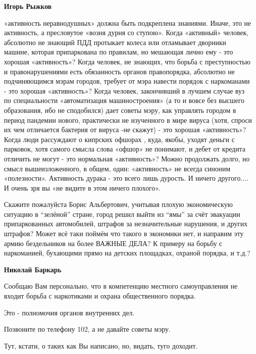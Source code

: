 \begin{itemize}
\begin{itemize}
\textbf{Игорь Рыжков} 

«активность неравнодушных» должна быть подкреплена знаниями. Иначе, это не
активность, а пресловутое «возня дурня со ступою». Когда «активный» человек,
абсолютно не знающий ПДД протыкает колеса или отламывает дворники машине,
которая припаркована по правилам, но мешающая лично ему - это хорошая
«активность»? Когда человек, не знающих, что борьба с преступностью и
правонарушениями есть обязанность органов правопорядка, абсолютно не
подчиняющимся мэрам городов, требует от мэра навести порядок с наркоманами -
это хорошая «активность»? Когда человек, закончивший в лучшем случае вуз по
специальности «автоматизация машиностроения» (а то и вовсе без высшего
образования, ибо не сподобился) дает советы мэру, как управлять городом в
период пандемии нового, практически не изученного в мире вируса (хотя, спроси
их чем отличается бактерия от вируса -не скажут) - это хорошая «активность»?
Когда люди рассуждают о кипрских офшорах , куда, якобы, уходят деньги с
парковок, хотя самого смысла слова «офшор» не понимают, и дебет от кредита
отличить не могут - это нормальная «активность»? Можно продолжать долго, но
смысл вышеизложенного, в общем, один: «активность» не всегда синоним
«полезности». Активность дурака - это всего лишь дурость. И ничего другого....
И очень зря вы «не видите в этом ничего плохого».

\end{itemize} %


Скажите пожалуйста Борис Альбертович, учитывая плохую экономическую ситуацию в
\enquote{зелёной} стране, город решил выйти из \enquote{ямы} за счёт эвакуации припаркованных
автомобилей, штрафов за незначительные нарушения, и других штрафов? Может всё
таки поймём что такого в экономики нет, и направим эту армию бездельников на
более ВАЖНЫЕ ДЕЛА? К примеру на борьбу с наркоманией, бухающими прямо на
детских площадках, охраной порядка, и т.д.?

\begin{itemize} %
\textbf{Николай Баркарь} 

Сообщаю Вам персонально, что в компетенцию местного самоуправления не входит
борьба с наркотиками и охрана общественного порядка.

Это - полномочия органов внутренних дел.

Позвоните по телефону 102, а не давайте советы мэру.

Тут, кстати, о таких как Вы написано, но, видать, туго доходит.


\end{itemize}
\end{itemize}
